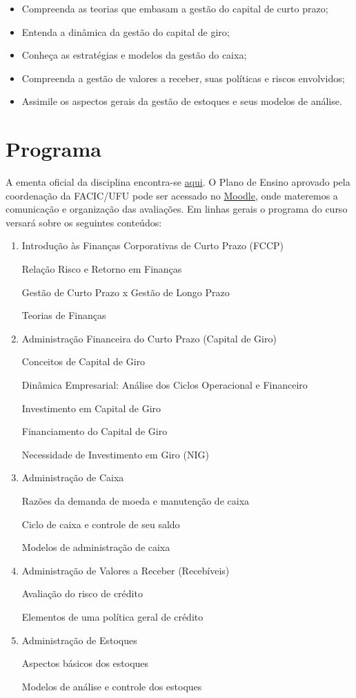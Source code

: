 \documentclass[
  a4paper,
]{book}
\begin{document}
\begin{itemize}
\item
  Compreenda as teorias que embasam a gestão do capital de curto prazo;
\item
  Entenda a dinâmica da gestão do capital de giro;
\item
  Conheça as estratégias e modelos da gestão do caixa;
\item
  Compreenda a gestão de valores a receber, suas políticas e riscos
  envolvidos;
\item
  Assimile os aspectos gerais da gestão de estoques e seus modelos de
  análise.
\end{itemize}

\section*{Programa}\label{sec-programa}


A ementa oficial da disciplina encontra-se
\href{https://www.facic.ufu.br/system/files/conteudo/28fagen39532_financas_corporativas_i.pdf}{aqui}.
O Plano de Ensino aprovado pela coordenação da FACIC/UFU pode ser
acessado no \href{https://moodle.ufu.br/login/index.php}{Moodle}, onde
materemos a comunicação e organização das avaliações. Em linhas gerais o
programa do curso versará sobre os seguintes conteúdos:

\begin{enumerate}
\def\labelenumi{\arabic{enumi}.}
\item
  Introdução às Finanças Corporativas de Curto Prazo (FCCP)

  Relação Risco e Retorno em Finanças

  Gestão de Curto Prazo x Gestão de Longo Prazo

  Teorias de Finanças
\item
  Administração Financeira do Curto Prazo (Capital de Giro)

  Conceitos de Capital de Giro

  Dinâmica Empresarial: Análise dos Ciclos Operacional e Financeiro

  Investimento em Capital de Giro

  Financiamento do Capital de Giro

  Necessidade de Investimento em Giro (NIG)
\item
  Administração de Caixa

  Razões da demanda de moeda e manutenção de caixa

  Ciclo de caixa e controle de seu saldo

  Modelos de administração de caixa
\item
  Administração de Valores a Receber (Recebíveis)

  Avaliação do risco de crédito

  Elementos de uma política geral de crédito
\item
  Administração de Estoques

  Aspectos básicos dos estoques

  Modelos de análise e controle dos estoques
\end{enumerate}
\end{document}
